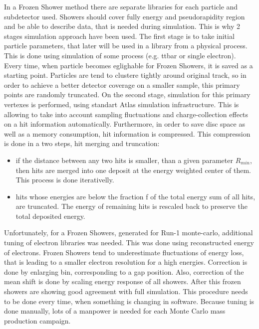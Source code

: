 In a Frozen Shower method there are separate libraries for each particle and subdetector used. Showers should cover fully energy and pseudorapidity region and be able to describe data, that is needed during simulation. This is why 2 stages simulation approach have been used. The first stage is to take initial particle parameters, that later will be used in a library from a physical process. This is done using simulation of some process (e.g. ttbar or single electron). Every time, when particle becomes eglighable for Frozen Showers, it is saved as a starting point. Particles are tend to clustere tightly around original track, so in order to achieve a better detector coverage on a smaller sample, this primary points are randomly truncated. On the second stage, simulation for this primary vertexes is performed, using standart Atlas simulation infrastructure. This is allowing to take into account sampling fluctuations and charge-collection effects on a hit information automatically. Furthermore, in order to save disc space as well as a memory consumption, hit information is compressed. This compression is done in a two steps, hit merging and truncation:
\begin{itemize}
\item if the distance between any two hits is smaller, than a given parameter $R_{min}$, then hits are merged into one deposit at the energy weighted center of them. This process is done iterativelly.
\item hits whose energies are below the fraction f of the total energy sum of all hits, are truncated. The energy of remaining hits is rescaled back to preserve the total deposited energy.
\end{itemize}
Unfortunately, for a Frozen Showers, generated for Run-1 monte-carlo, additional tuning of electron libraries was needed. This was done using reconstructed energy of electrons. Frozen Showers tend to underestimate fluctuations of energy loss, that is leading to a smaller electron resolution for a high energies. Correction is done by enlarging bin, corresponding to a gap position. Also, correction of the mean shift is done by scaling energy response of all showers. After this frozen showers are showing good agreement with full simulation. This procedure needs to be done every time, when something is changing in software. Because tuning is done manually, lots of a manpower is needed for each Monte Carlo mass production campaign.



\begin{figure}[h]
\end{figure}

